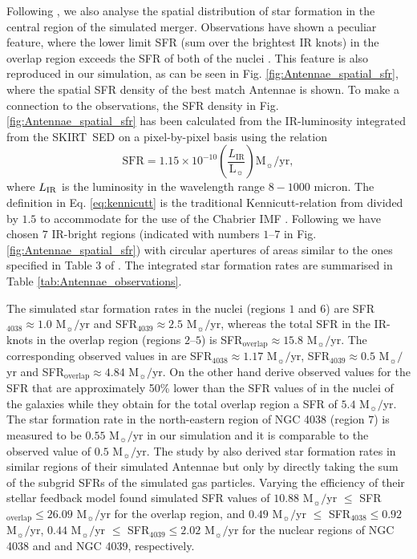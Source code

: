 \documentclass[a4paper,fleqn,usenatbib]{mnras}
\newcommand{\skirt}{\textsc{SKIRT}}
\begin{document}
Following \citet{2010ApJ...715L..88K,2013MNRAS.434..696K}, we also analyse the 
spatial distribution of star formation in the central region of the simulated merger. 
Observations have shown a peculiar feature, where the lower limit SFR 
(sum over the brightest IR knots) in the overlap region exceeds the SFR of both of the 
nuclei \citep{2009ApJ...699.1982B, 2010A&A...518L..44K}. This feature is also reproduced in 
our simulation, as can be seen in Fig. \ref{fig:Antennae_spatial_sfr}, where 
the spatial SFR density of the best match Antennae is shown. To make a connection to the observations, 
the SFR density in Fig. \ref{fig:Antennae_spatial_sfr} has been calculated from the IR-luminosity
integrated from the \skirt\ SED on a pixel-by-pixel basis using the relation 
\begin{equation}\label{eq:kennicutt}
 \mathrm{SFR}=1.15\times10^{-10} \left(\frac{L_{\mathrm{IR}}}{\mathrm{L}_{\sun}}\right) \mathrm{M}_{\sun}/\mathrm{yr},
\end{equation}
where $L_{\rm IR}$ is the luminosity in the wavelength range $8-1000$ micron. The definition in Eq. \ref{eq:kennicutt} is the
traditional Kennicutt-relation from \citet{1998ApJ...498..541K} divided by $1.5$
to accommodate for the use of the Chabrier IMF \citep{2007ApJS..173..267S, 2007ApJS..173..315S}.
Following \citet{2010A&A...518L..44K} we have chosen $7$ IR-bright regions (indicated with 
numbers $1$--$7$ in
Fig. \ref{fig:Antennae_spatial_sfr}) with circular apertures of areas similar to the ones specified in
Table 3 of \citet{2010A&A...518L..44K}. The integrated star formation rates are summarised in Table \ref{tab:Antennae_observations}. 

The simulated star formation rates in the nuclei (regions $1$ and $6$) are SFR$_\mathrm{4038}\approx1.0$ M$_{\sun}/$yr and 
SFR$_\mathrm{4039}\approx2.5$ M$_{\sun}/$yr, whereas the total SFR in the IR-knots in the
overlap region (regions $2$--$5$) is SFR$_\mathrm{overlap}\approx15.8$ M$_{\sun}/$yr. The corresponding observed values
in \citet{2010A&A...518L..44K} are SFR$_\mathrm{4038}\approx1.17$ M$_{\sun}/$yr, 
SFR$_\mathrm{4039}\approx0.5$ M$_{\sun}/$yr and SFR$_\mathrm{overlap}\approx4.84$ M$_{\sun}/$yr.
On the other hand \citet{2009ApJ...699.1982B} derive observed values for the SFR that are   
approximately 50\% lower than the SFR values of \citet{2010A&A...518L..44K} 
in the nuclei of the galaxies while they obtain for the total overlap region a SFR of $5.4$ M$_{\sun}/$yr. 
The star formation rate in the north-eastern region of NGC 4038 (region $7$) is measured to be $0.55$ M$_{\sun}/$yr
in our simulation and it is comparable to the observed value of $0.5$ M$_{\sun}/$yr.
The study by \citet{2013MNRAS.434..696K} also derived star formation rates in similar regions of their simulated Antennae but only
by directly taking the sum of the subgrid SFRs of the simulated gas particles. Varying the efficiency of their stellar feedback
model \citet{2013MNRAS.434..696K} found simulated SFR values of $10.88$ M$_{\sun}/$yr $\le$ SFR$_\mathrm{overlap}\le26.09$ M$_{\sun}/$yr for 
the overlap region, and $0.49$ M$_{\sun}/$yr $\le$ SFR$_\mathrm{4038}\le0.92$ M$_{\sun}/$yr, $0.44$ M$_{\sun}/$yr $\le$ SFR$_\mathrm{4039}\le2.02$ M$_{\sun}/$yr
for the nuclear regions of NGC 4038 and and NGC 4039, respectively.
\end{document}
